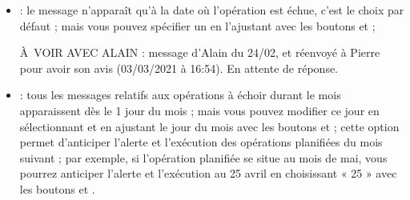 \begin{itemize}
	\ifIllustration
	\label{setup-plannedtransactions-img}
	\fi
	\item {} : le message n'apparaît qu'à la date où l'opération est échue, c'est le choix par défaut ; mais vous pouvez spécifier un  en l'ajustant avec les boutons \menu{+} et \menu{-} ;
	
	À VOIR AVEC ALAIN : message d'Alain du 24/02, et réenvoyé à Pierre pour avoir son avis (03/03/2021 à 16:54). En attente de réponse.
	
	
	
	
	\item {} : tous les messages relatifs aux  opérations à échoir durant le mois  apparaissent dès le 1 jour du mois ; mais vous pouvez modifier ce jour en sélectionnant  et en ajustant le jour du mois avec les boutons \menu{+} et \menu{-} ; cette option permet d'anticiper l'alerte et l'exécution des opérations planifiées du mois suivant ; par exemple, si l'opération planifiée se situe au mois de mai, vous pourrez anticiper l'alerte et l'exécution au 25 avril en choisissant « 25 » avec les boutons \menu{+} et \menu{-}.
\end{itemize}


